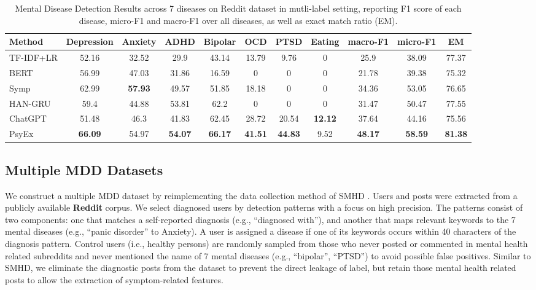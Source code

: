 \begin{table}[th]
    \small
    \centering
    \begin{tabular}{l|ccccccc|cc|c}
    \hline
    Method & Depression & Anxiety & ADHD & Bipolar & OCD & PTSD & Eating &  macro-F1 & micro-F1 & EM \\ 
    \hline
    TF-IDF+LR & 52.16& 32.52& 29.9&	43.14&	13.79&	9.76 & 	0& 25.9&38.09&	77.37  \\
    BERT & 56.99&	47.03&	31.86&	16.59&	0&	0&	0 & 21.78& 39.38&	75.32  \\
    Symp & 62.99&	\textbf{57.93}&	49.57&	51.85&	18.18&	0&	0& 34.36& 53.05&	76.65   \\
    HAN-GRU &59.4&	44.88&	53.81&	62.2&	0&	0&	0 & 31.47 & 50.47 & 77.55\\
    ChatGPT & 51.48	&46.3	&41.83	&62.45	&28.72	&20.54	&\textbf{12.12}&	37.64&	44.16&	75.56\\
    \hline
    PsyEx & \textbf{66.09}& 54.97 & \textbf{54.07}&\textbf{66.17}&\textbf{41.51} & \textbf{44.83} & 9.52&\textbf{48.17}&\textbf{58.59}&\textbf{81.38} \\ 
    \hline
    \end{tabular}
    \caption{ Mental Disease Detection Results across 7 diseases on Reddit dataset in mutli-label setting, reporting F1 score of each disease, micro-F1 and macro-F1 over all diseases, as well as exact match ratio (EM). }
    \label{tab:disease_multi_label}
\end{table}

\subsection{Multiple MDD Datasets}
\label{sec:mdd_dataset}
We construct a multiple MDD dataset by reimplementing the data collection method of SMHD \cite{cohan2018smhd}. Users and posts were extracted from a publicly available \textbf{Reddit} corpus. We select diagnosed users by detection patterns with a focus on high precision. The patterns consist of two components: one that matches a self-reported diagnosis (e.g., ``diagnosed with''), and another that maps relevant keywords to the 7 mental diseases (e.g., ``panic disorder'' to Anxiety). A user is assigned a disease if one of its keywords occurs within 40 characters of the diagnosis pattern. Control users (i.e., healthy persons) are randomly sampled from those who never posted or commented in mental health related subreddits and never mentioned the name of 7 mental diseases (e.g., ``bipolar'', ``PTSD'') to avoid possible false positives. 
Similar to SMHD, we eliminate the diagnostic posts from the dataset to prevent the direct leakage of label, but retain those mental health related posts to allow the extraction of symptom-related features. 

